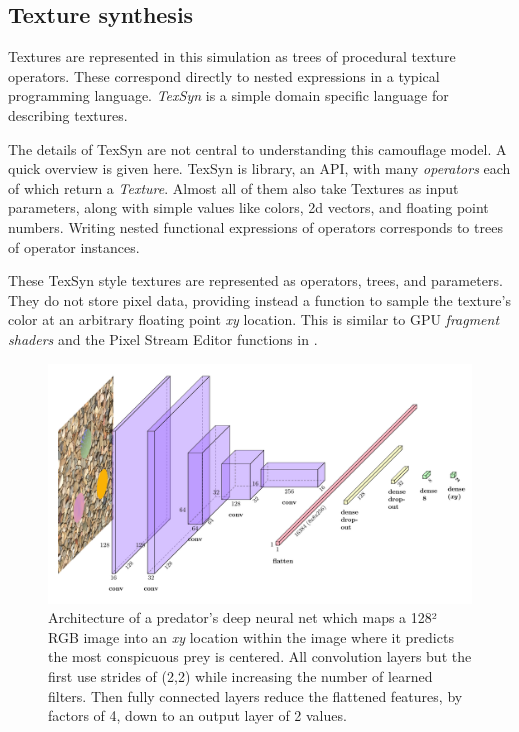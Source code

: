 \documentclass[sigconf]{acmart}
\newcommand{\jargon}[1]{\textit{#1}}
\begin{document}
\subsection{Texture synthesis}
Textures are represented in this simulation as trees of procedural texture operators. These correspond directly to nested expressions in a typical programming language. \jargon{TexSyn} is a simple domain specific language for describing textures.
\par
The details of TexSyn are not central to understanding this camouflage model. A quick overview is given here. TexSyn is library, an API, with many \jargon{operators} each of which return a \jargon{Texture}. Almost all of them also take Textures as input parameters, along with simple values like colors, 2d vectors, and floating point numbers. Writing nested functional expressions of operators corresponds to trees of operator instances.
\par
These TexSyn style textures are represented as operators, trees, and parameters. They do not store pixel data, providing instead a function to sample the texture's color at an arbitrary floating point \textit{xy} location. This is similar to GPU \jargon{fragment shaders} and the Pixel Stream Editor functions in \cite{perlin_image_1985}.
\par
[... see Figure \ref{fig:TexSyn_overview} ...]
\par


\begin{figure}
    \includegraphics[width=\columnwidth]{images/predator_cnn.pdf}
    \caption{Architecture of a predator's deep neural net which maps a 128² RGB image into an \textit{xy} location within the image where it predicts the most conspicuous prey is centered. All convolution layers but the first use strides of (2,2) while increasing the number of learned filters. Then fully connected layers reduce the flattened features, by factors of 4, down to an output layer of 2 values.}
    \label{fig:predator_cnn}
\end{figure}
\end{document}
